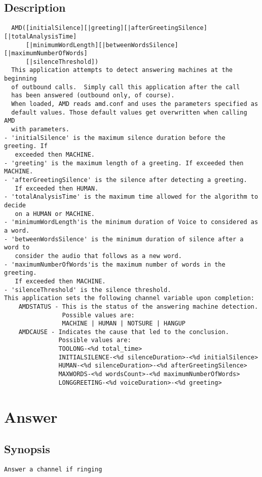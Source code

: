 \subsection{Description}
\begin{verbatim}
  AMD([initialSilence][|greeting][|afterGreetingSilence][|totalAnalysisTime]
      [|minimumWordLength][|betweenWordsSilence][|maximumNumberOfWords]
      [|silenceThreshold])
  This application attempts to detect answering machines at the beginning
  of outbound calls.  Simply call this application after the call
  has been answered (outbound only, of course).
  When loaded, AMD reads amd.conf and uses the parameters specified as
  default values. Those default values get overwritten when calling AMD
  with parameters.
- 'initialSilence' is the maximum silence duration before the greeting. If
   exceeded then MACHINE.
- 'greeting' is the maximum length of a greeting. If exceeded then MACHINE.
- 'afterGreetingSilence' is the silence after detecting a greeting.
   If exceeded then HUMAN.
- 'totalAnalysisTime' is the maximum time allowed for the algorithm to decide
   on a HUMAN or MACHINE.
- 'minimumWordLength'is the minimum duration of Voice to considered as a word.
- 'betweenWordsSilence' is the minimum duration of silence after a word to 
   consider the audio that follows as a new word.
- 'maximumNumberOfWords'is the maximum number of words in the greeting. 
   If exceeded then MACHINE.
- 'silenceThreshold' is the silence threshold.
This application sets the following channel variable upon completion:
    AMDSTATUS - This is the status of the answering machine detection.
                Possible values are:
                MACHINE | HUMAN | NOTSURE | HANGUP
    AMDCAUSE - Indicates the cause that led to the conclusion.
               Possible values are:
               TOOLONG-<%d total_time>
               INITIALSILENCE-<%d silenceDuration>-<%d initialSilence>
               HUMAN-<%d silenceDuration>-<%d afterGreetingSilence>
               MAXWORDS-<%d wordsCount>-<%d maximumNumberOfWords>
               LONGGREETING-<%d voiceDuration>-<%d greeting>

\end{verbatim}


\section{Answer}
\subsection{Synopsis}
\begin{verbatim}
Answer a channel if ringing
\end{verbatim}
